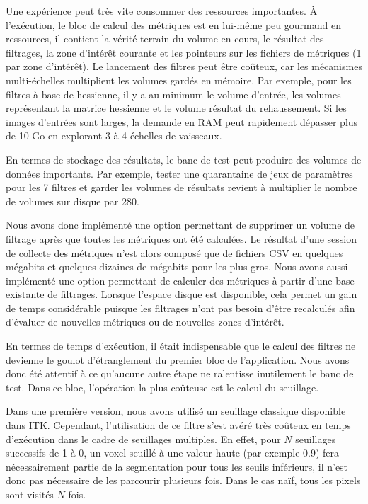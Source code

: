 Une expérience peut très vite consommer des ressources importantes. À l'exécution, le bloc de calcul des métriques est en lui-même peu gourmand en ressources, il contient la vérité terrain du volume en cours, le résultat des filtrages, la zone d'intérêt courante et les pointeurs sur les fichiers de métriques (1 par zone d'intérêt). Le lancement des filtres peut être coûteux, car les mécanismes multi-échelles multiplient les volumes gardés en mémoire. Par exemple, pour les filtres à base de hessienne, il y a au minimum le volume d'entrée, les volumes représentant la matrice hessienne et le volume résultat du rehaussement. Si les images d'entrées sont larges, la demande en RAM peut rapidement dépasser plus de 10 Go en explorant 3 à 4 échelles de vaisseaux. 

En termes de stockage des résultats, le banc de test peut produire des volumes de données importants. Par exemple, tester une quarantaine de jeux de paramètres pour les 7 filtres et garder les volumes de résultats revient à multiplier le nombre de volumes sur disque par 280. 

Nous avons donc implémenté une option permettant de supprimer un volume de filtrage après que toutes les métriques ont été calculées. Le résultat d'une session de collecte des métriques n'est alors composé que de fichiers CSV en quelques mégabits et quelques dizaines de mégabits pour les plus gros. Nous avons aussi implémenté une option permettant de calculer des métriques à partir d'une base existante de filtrages. Lorsque l'espace disque est disponible, cela permet un gain de temps considérable puisque les filtrages n'ont pas besoin d'être recalculés afin d'évaluer de nouvelles métriques ou de nouvelles zones d'intérêt.

En termes de temps d'exécution, il était indispensable que le calcul des filtres ne devienne le goulot d'étranglement du premier bloc de l'application. Nous avons donc été attentif à ce qu'aucune autre étape ne ralentisse inutilement le banc de test. Dans ce bloc, l'opération la plus coûteuse est le calcul du seuillage.

Dans une première version, nous avons utilisé un seuillage classique disponible dans ITK. Cependant, l'utilisation de ce filtre s'est avéré très coûteux en temps d'exécution dans le cadre de seuillages multiples. En effet, pour $N$ seuillages successifs de 1 à 0, un voxel seuillé à une valeur haute (par exemple 0.9) fera nécessairement partie de la segmentation pour tous les seuils inférieurs, il n'est donc pas nécessaire de les parcourir plusieurs fois. Dans le cas naïf, tous les pixels sont visités $N$ fois.

